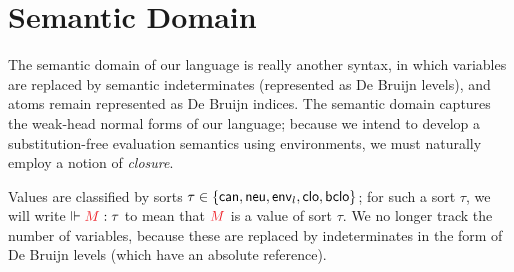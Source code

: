 \documentclass{article}
\DeclarePairedDelimiter\Parens{\lparen}{\rparen}
\DeclarePairedDelimiter\Squares{[}{]}
\DeclarePairedDelimiter\Braces{\lbrace}{\rbrace}
\newcommand\FmtKwd[1]{\mathsf{#1}}
\newcommand\DeclBox[1]{\framebox{$\displaystyle{}#1$}}
\newcommand\FormatList[3]{%
  \xintFor ##1 in {#3} \do{%
    #1{##1}%
    \xintifForLast{}{#2}
  }
}
\newcommand\Var[1]{\mathsf{v}_{#1}}
\newcommand\FmtVal[1]{{\color{Red}{#1}}}
\newcommand\VExp[2]{
  \FmtVal{
    \Parens*{
      \FmtKwd{#1}\
      \FormatList{}{\ }{#2}
    }
  }
}
\begin{document}
\section{Semantic Domain}

The semantic domain of our language is really another syntax, in which
variables are replaced by semantic indeterminates (represented as De
Bruijn levels), and atoms remain represented as De Bruijn indices. The
semantic domain captures the weak-head normal forms of our language;
because we intend to develop a substitution-free evaluation semantics using
environments, we must naturally employ a notion of \emph{closure}.

\newcommand\SortCan{\FmtKwd{can}}
\newcommand\SortNeu{\FmtKwd{neu}}
\newcommand\SortClo{\FmtKwd{clo}}
\newcommand\SortBClo{\FmtKwd{bclo}}
\newcommand\SortEnv[1]{\FmtKwd{env}_{#1}}
\newcommand\IsVal[2]{\Vdash\FmtVal{#1}:{#2}}

\newcommand\Clo[4]{
  \text{(TODO)}
}

\newcommand\BClo[4]{
  \text{(TODO)}
}


Values are classified by sorts
$\tau\in\Braces*{\SortCan,\SortNeu,\SortEnv{l},\SortClo,\SortBClo}$; for
such a sort $\tau$, we will write $\IsVal{M}{\tau}$ to mean that
$\FmtVal{M}$ is a value of sort $\tau$. We no longer
track the number of variables, because these are replaced by
indeterminates in the form of De Bruijn levels (which have an absolute
reference).

\end{document}
